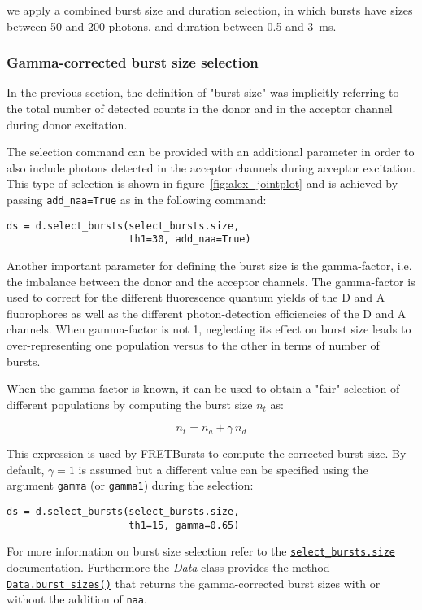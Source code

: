 we apply a combined burst size and duration selection, in which bursts
have sizes between 50 and 200 photons, and duration between 0.5 and 3~ms.

\subsubsection{Gamma-corrected burst size selection}

In the previous section, the definition of "burst size" was implicitly referring
to the total number of detected counts in the donor and in the acceptor channel
during donor excitation.

The selection command can be provided with an additional parameter in order to
also include photons detected in the acceptor channels during acceptor excitation.
This type of selection is shown in figure~\ref{fig:alex_jointplot} and is achieved 
by passing \verb|add_naa=True| as in the following command:

\begin{verbatim}
ds = d.select_bursts(select_bursts.size,
                     th1=30, add_naa=True)
\end{verbatim}

Another important parameter for defining the burst size is the gamma-factor, i.e.
the imbalance between the donor and the acceptor channels. The gamma-factor is
used to correct for the different fluorescence quantum yields of the D and A
fluorophores as well as the different photon-detection efficiencies of the D and A channels.
When gamma-factor is not 1, neglecting its effect on burst size leads to
over-representing one population versus to the other in terms of number of bursts.

When the gamma factor is known, it can be used to obtain a "fair" selection
of different populations by computing the burst size $n_t$ as:

$$ n_t = n_a + \gamma\,n_d$$ 

This expression is used by FRETBursts to compute the corrected burst size.
By default, $\gamma=1$ is assumed but a different value can be specified
using the argument \verb|gamma| (or \verb|gamma1|) during the selection:

\begin{verbatim}
ds = d.select_bursts(select_bursts.size,
                     th1=15, gamma=0.65)
\end{verbatim}

For more information on burst size selection refer to the
\href{http://fretbursts.readthedocs.org/en/latest/burst_selection.html#fretbursts.select\_bursts.size}{\texttt{select\_bursts.size} documentation}. Furthermore the \textit{Data} class provides the
\href{http://fretbursts.readthedocs.org/en/latest/data_class.html#fretbursts.burstlib.Data.burst_sizes}{method \texttt{Data.burst\_sizes()}} that returns the gamma-corrected burst sizes with or
without the addition of \verb|naa|.

